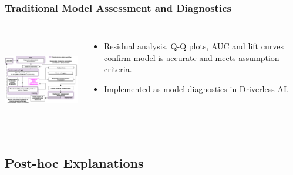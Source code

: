 \documentclass[11pt,
               aspectratio=169,
               hyperref={colorlinks}
               ]{beamer}
\begin{document}
			\begin{frame}
		
				\frametitle{Traditional Model Assessment and Diagnostics}		
			
				\begin{columns}			
			
					\centering
					\includegraphics[height=120pt]{img/ma.png}
				
					\vspace{-5pt}
					\begin{itemize}
						\item Residual analysis, Q-Q plots, AUC and lift curves confirm model is accurate and meets assumption criteria.
						\item Implemented as model diagnostics in Driverless AI.
					\end{itemize}
				
				\end{columns}
		
			\end{frame}

		\subsection{Post-hoc Explanations}
			
\end{document}
